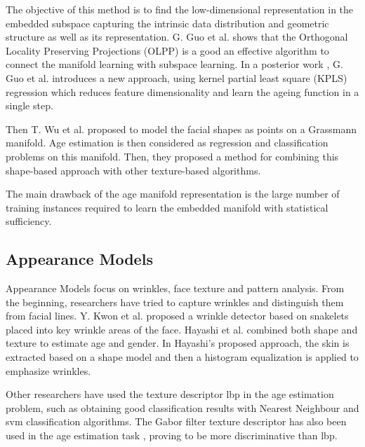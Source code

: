 The objective of this method is to find the low-dimensional representation in the embedded subspace capturing the intrinsic data distribution and geometric structure as well as its representation. G. Guo et al. \cite{Guo:2008:IHA:2319085.2321608} \cite{4531189} shows that the Orthogonal Locality Preserving Projections (OLPP) \cite{CHHZ06}  is a good an effective algorithm  to connect the manifold learning with subspace learning. In a posterior work \cite{5995404}, G. Guo et al. introduces a new approach, using kernel partial least square (KPLS) regression which reduces feature dimensionality and learn the ageing function in a single step.

Then T. Wu et al. \cite{journals/tifs/WuTC12} proposed to model the facial shapes as points on a Grassmann manifold. Age estimation is then considered as regression and classification problems on this manifold. Then, they proposed a method for combining this shape-based approach with other texture-based algorithms.

The main drawback of the age manifold representation is the large number of training instances required to learn the embedded manifold with statistical sufficiency.

\subsection{Appearance Models}\label{subsec:BIF}

Appearance Models focus on wrinkles, face texture and pattern analysis. From the beginning, researchers have tried to capture wrinkles and distinguish them from facial lines. Y. Kwon et al. \cite{Kwon:1999:ACF:311844.311845} proposed a wrinkle detector based on snakelets \cite{Kass88snakes:active} placed into key wrinkle areas of the face. Hayashi et al. \cite{969698} \cite{1195171} \cite{conf/icpr/HayashiYIK02} combined both shape and texture to estimate age and gender. In Hayashi's proposed approach, the skin is extracted based on a shape model and then a histogram equalization is applied to emphasize wrinkles.

Other researchers have used the texture descriptor \gls{lbp} \cite{Ahonen:2006:FDL:1175897.1176245} in the age estimation problem, such as \cite{4717926} \cite{6460367} obtaining good classification results with Nearest Neighbour and \gls{svm} classification algorithms. The Gabor \cite{Liu:2002:GFB:2319007.2320264} filter texture descriptor has also been used in the age estimation task  \cite{Gao:2009:FAC:1567988.1568003}, proving to be more discriminative than \gls{lbp}.

